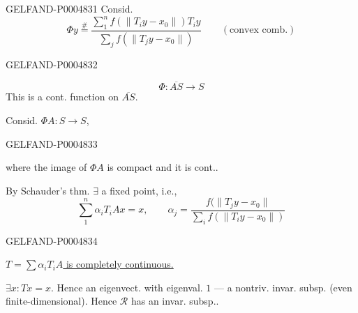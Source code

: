 \begin{GelfandAdjacentEvidence}{GELFAND-P000483}{1}
Consid.
\[
\Phi y\overset{\#}{=}
\frac{\displaystyle\sum_1^n f(\lVert T_i y-x_0\rVert)T_i y}
{\displaystyle\sum_j f(\lVert T_j y-x_0\rVert)}
\qquad(\text{convex comb.})
\]
\end{GelfandAdjacentEvidence}
\begin{GelfandAdjacentEvidence}{GELFAND-P000483}{2}

\[
\Phi\colon\overline{AS}\longrightarrow S
\]
This is a cont. function on $\overline{AS}$.

Consid. $\Phi A\colon S\longrightarrow S$,
\end{GelfandAdjacentEvidence}
\begin{GelfandAdjacentEvidence}{GELFAND-P000483}{3}

where the image of $\Phi A$ is compact and it is cont..

By Schauder’s thm. $\exists$ a fixed point, i.e.,
\[
\sum_1^n\alpha_i T_i Ax=x,\qquad
\alpha_j=\frac{f(\lVert T_jy-x_0\rVert}
{\displaystyle\sum_i f(\lVert T_i y-x_0\rVert)}
\]
\end{GelfandAdjacentEvidence}
\begin{GelfandAdjacentEvidence}{GELFAND-P000483}{4}


\uline{\mbox{$T=\sum\alpha_i T_i A$} is completely continuous.}

$\exists x\colon Tx=x$. Hence an eigenvect. with eigenval. $1$ —
a nontriv. invar. subsp. (even finite-dimensional).
Hence $\mathcal R$ has an invar. subsp..
\end{GelfandAdjacentEvidence}
